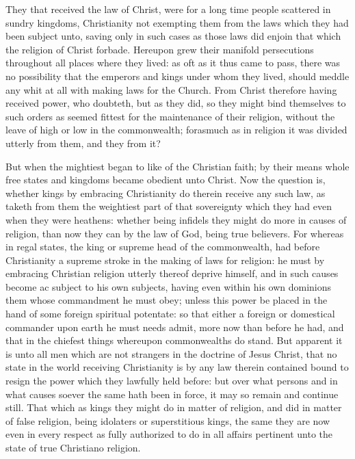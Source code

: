 They that received the law of Christ, were for a long time people scattered in sundry kingdoms, Christianity not exempting them from the laws which they had been subject unto, saving only in such cases as those laws did enjoin that which the religion of Christ forbade. Hereupon grew their manifold persecutions throughout all places where they lived: as oft as it thus came to pass, there was no possibility that the emperors and kings under whom they lived, should meddle any whit at all with making laws for the Church. From Christ therefore having received power, who doubteth, but as they did, so they might bind themselves to such orders as seemed fittest for the maintenance of their religion, without the leave of high or low in the commonwealth; forasmuch as in religion it was divided utterly from them, and they from it?

But when the mightiest began to like of the Christian faith; by their means whole free states and kingdoms became obedient unto Christ. Now the question is, whether kings by embracing Christianity do therein receive any such law, as taketh from them the weightiest part of that sovereignty which they had even when they were heathens: whether being infidels they might do more in causes of religion, than now they can by the law of God, being true believers. For whereas in regal states, the king or supreme head of the commonwealth, had before Christianity a supreme stroke in the making of laws for religion: he must by embracing Christian religion utterly thereof deprive himself, and in such causes become ac subject to his own subjects, having even within his own dominions them whose commandment he must obey; unless this power be placed in the hand of some foreign spiritual potentate: so that either a foreign or domestical commander upon earth he must needs admit, more now than before he had, and that in the chiefest things whereupon commonwealths do stand. But apparent it is unto all men which are not strangers in the doctrine of Jesus Christ, that no state in the world receiving Christianity is by any law therein contained  bound to resign the power which they lawfully held before: but over what persons and in what causes soever the same hath been in force, it may so remain and continue still. That which as kings they might do in matter of religion, and did in matter of false religion, being idolaters or superstitious kings, the same they are now even in every respect as fully authorized to do in all affairs pertinent unto the state of true Christiano religion.

